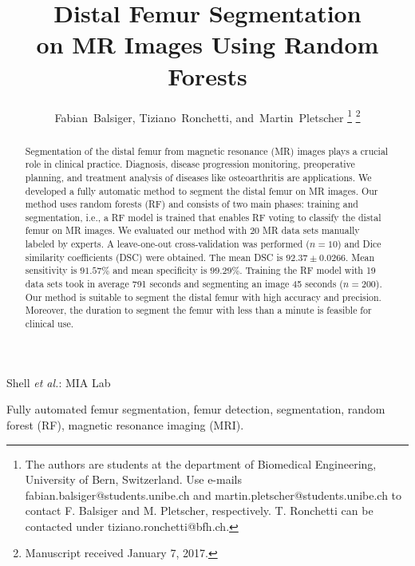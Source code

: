 \documentclass[journal]{IEEEtran}
\begin{document}
\title{Distal Femur Segmentation\\on MR Images Using Random Forests}

\author{Fabian~Balsiger, %
        Tiziano~Ronchetti, %
        and~Martin~Pletscher %
\thanks{The authors are students at the department of Biomedical Engineering, University of Bern, Switzerland. Use e-mails fabian.balsiger@students.unibe.ch and martin.pletscher@students.unibe.ch to contact F. Balsiger and M. Pletscher, respectively. T. Ronchetti can be contacted under tiziano.ronchetti@bfh.ch.}%
\thanks{Manuscript received January 7, 2017.}}

%
{Shell \MakeLowercase{\textit{et al.}}: MIA Lab}

\maketitle

\begin{abstract}
Segmentation of the distal femur from magnetic resonance (MR) images plays a crucial role in clinical practice. Diagnosis, disease progression monitoring, preoperative planning, and treatment analysis of diseases like osteoarthritis are applications. We developed a fully automatic method to segment the distal femur on MR images. Our method uses random forests (RF) and consists of two main phases: training and segmentation, i.e., a RF model is trained that enables RF voting to classify the distal femur on MR images. We evaluated our method with 20 MR data sets manually labeled by experts. A leave-one-out cross-validation was performed ($n=10$) and Dice similarity coefficients (DSC) were obtained. The mean DSC is $92.37 \pm 0.0266$. Mean sensitivity is $91.57 \%$ and mean specificity is $99.29 \%$. Training the RF model with 19 data sets took in average 791 seconds and segmenting an image 45 seconds ($n=200$). Our method is suitable to segment the distal femur with high accuracy and precision. Moreover, the duration to segment the femur with less than a minute is feasible for clinical use.
\end{abstract}

\begin{IEEEkeywords}
Fully automated femur segmentation, femur detection, segmentation, random forest (RF), magnetic resonance imaging (MRI).
\end{IEEEkeywords}
\end{document}
